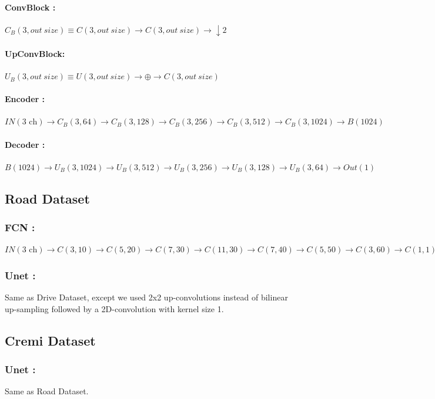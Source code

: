 \paragraph{ConvBlock :} $C_B(3, out~size)\equiv C(3,out~size)\rightarrow C(3,out~size)\rightarrow \downarrow 2$
\paragraph{UpConvBlock:} $U_B(3, out~size)\equiv U(3,out~size)\rightarrow \oplus\rightarrow C(3,out~size)$
\paragraph{Encoder :}
$IN(\mbox{3 ch})\rightarrow C_B(3,64)\rightarrow C_B(3,128) \rightarrow C_B(3,256)\rightarrow C_B(3,512)\rightarrow C_B(3,1024)\rightarrow B(1024)$
\paragraph{Decoder :}
$B(1024)\rightarrow U_B(3,1024)\rightarrow U_B(3,512)\rightarrow U_B(3,256) \rightarrow U_B(3,128)\rightarrow U_B(3,64)\rightarrow Out(1)$

\subsection{Road Dataset}
\subsubsection{FCN :}
$IN(\mbox{3 ch})\rightarrow C(3,10)\rightarrow C(5,20)\rightarrow C(7,30)\rightarrow C(11,30)\rightarrow C(7,40) \rightarrow C(5,50)\rightarrow C(3,60)\rightarrow C(1,1)\rightarrow Out(1)$
\subsubsection{Unet :}
Same as Drive Dataset, except we used 2x2 up-convolutions instead of bilinear up-sampling followed by a 2D-convolution with kernel size 1.

\subsection{Cremi Dataset}
\subsubsection{Unet :}
Same as Road Dataset. 

